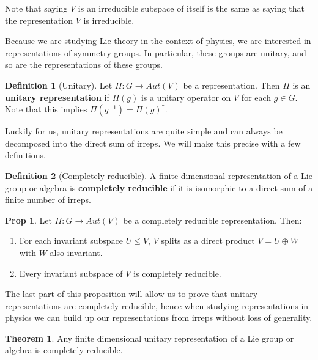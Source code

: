 \documentclass[11pt, oneside]{article}   	%
\theoremstyle{definition}
\newtheorem{definition}{Definition}[section]
\newtheorem{theorem}{Theorem}[section]
\newtheorem{prop}{Prop}[section]
\begin{document}
Note that saying $V$ is an irreducible subspace of itself is the same as saying that the representation $V$ 
is irreducible. 

Because we are studying Lie theory in the context of physics, we are interested in representations of 
symmetry groups. In particular, these groups are unitary, and so are the representations of these groups.
\begin{definition}[Unitary]
	Let $\Pi : G\rightarrow Aut(V)$ be a representation. Then $\Pi$ is an \textbf{unitary representation} if $\Pi(g)$ 
	is a unitary operator on $V$ for each $g\in G$. Note that this implies $\Pi(g^{-1}) = \Pi(g)^\dagger$. 
\end{definition}

Luckily for us, unitary representations are quite simple and can always be decomposed into the direct sum of irreps. 
We will make this precise with a few definitions.

\begin{definition}[Completely reducible]
	A finite dimensional representation of a Lie group or algebra is \textbf{completely reducible} if it is isomorphic 
	to a direct sum of a finite number of irreps. 
\end{definition}

\begin{prop}
	Let $\Pi : G\rightarrow Aut(V)$ be a completely reducible representation. Then:
	\begin{enumerate}
		\item For each invariant subspace $U\leq V$, $V$ splits as a direct product $V = U\oplus W$ with 
		$W$ also invariant. 
		\item Every invariant subspace of $V$ is completely reducible.
	\end{enumerate}
\end{prop}

The last part of this proposition will allow us to prove that unitary representations are completely reducible, hence 
when studying representations in physics we can build up our representations from irreps without loss of generality.

\begin{theorem}
	Any finite dimensional unitary representation of a Lie group or algebra is completely reducible.
\end{theorem}
\end{document}
